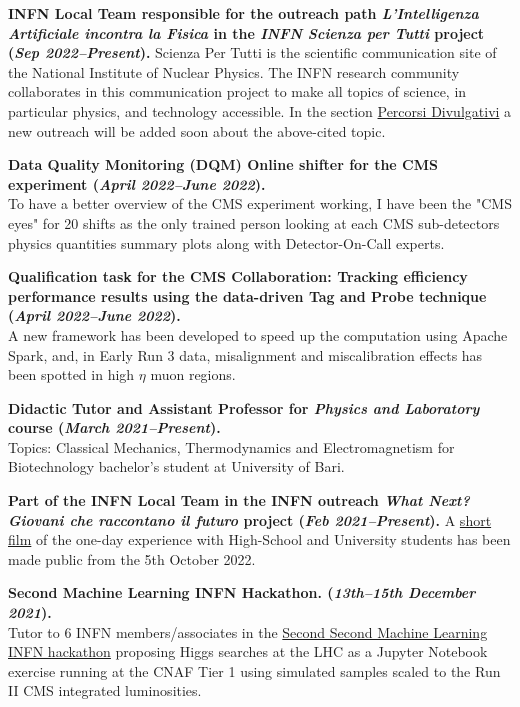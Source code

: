 \documentclass[11pt]{res}
\begin{document}
\begin{resume}
\textbf{INFN Local Team responsible for the outreach path \textit{L'Intelligenza Artificiale incontra la Fisica} in the \textit{INFN Scienza per Tutti} project (\textit{Sep 2022--Present}).}
Scienza Per Tutti is the scientific communication site of the National Institute of Nuclear Physics. The INFN research community collaborates in this communication project to make all topics of science, in particular physics, and technology accessible. In the section \href{https://scienzapertutti.infn.it/percorsi-divulgativi}{Percorsi Divulgativi} a new outreach will be added soon about the above-cited topic.

\textbf{Data Quality Monitoring (DQM) Online shifter for the CMS experiment (\textit{April 2022--June 2022}).}\\
To have a better overview of the CMS experiment working, I have been the "CMS eyes" for 20 shifts as the only trained person looking at each CMS sub-detectors physics quantities summary plots along with Detector-On-Call experts.

\textbf{Qualification task for the CMS Collaboration: Tracking efficiency performance results using the data-driven Tag and Probe technique (\textit{April 2022--June 2022}).}\\
A new framework has been developed to speed up the computation using Apache Spark, and, in Early Run 3 data, misalignment and miscalibration effects has been spotted in high $\eta$ muon regions.

\textbf{Didactic Tutor and Assistant Professor for \textit{Physics and Laboratory} course (\textit{March 2021--Present}).}\\
Topics: Classical Mechanics, Thermodynamics and Electromagnetism for Biotechnology bachelor's student at University of Bari.

\textbf{Part of the INFN Local Team in the INFN outreach \textit{What Next? Giovani che raccontano il futuro} project (\textit{Feb 2021--Present}).}
A \href{https://next.infn.it/il-cortometraggio/}{short film} of the one-day experience with High-School and University students has been made public from the 5th October 2022.

\textbf{Second Machine Learning INFN Hackathon. (\textit{13th--15th December 2021}).}\\ 
Tutor to 6 INFN members/associates in the \href{https://agenda.infn.it/event/28565/contributions/148551/}{Second Second Machine Learning INFN hackathon} proposing Higgs searches at the LHC as a Jupyter Notebook exercise running at the CNAF Tier 1 using simulated samples scaled to the Run II CMS integrated luminosities.



\end{resume}
\end{document}
